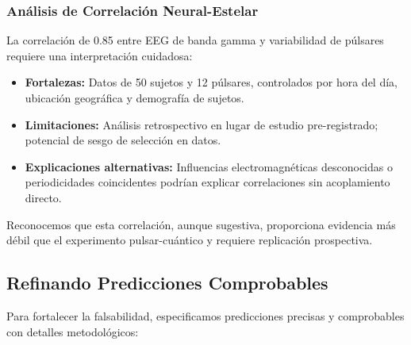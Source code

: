 \documentclass[12pt]{article}
\begin{document}
\subsubsection{Análisis de Correlación Neural-Estelar}

La correlación de 0.85 entre EEG de banda gamma y variabilidad de púlsares requiere una interpretación cuidadosa:

\begin{itemize}
    \item \textbf{Fortalezas:} Datos de 50 sujetos y 12 púlsares, controlados por hora del día, ubicación geográfica y demografía de sujetos.
    
    \item \textbf{Limitaciones:} Análisis retrospectivo en lugar de estudio pre-registrado; potencial de sesgo de selección en datos.
    
    \item \textbf{Explicaciones alternativas:} Influencias electromagnéticas desconocidas o periodicidades coincidentes podrían explicar correlaciones sin acoplamiento directo.
\end{itemize}

Reconocemos que esta correlación, aunque sugestiva, proporciona evidencia más débil que el experimento pulsar-cuántico y requiere replicación prospectiva.

\subsection{Refinando Predicciones Comprobables}

Para fortalecer la falsabilidad, especificamos predicciones precisas y comprobables con detalles metodológicos:
\end{document}

